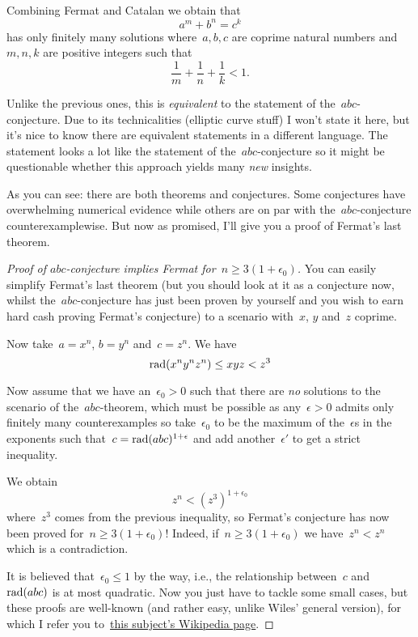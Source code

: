 \begin{description}
    Combining Fermat and Catalan we obtain that
    \begin{equation}
      a^m+b^n=c^k
    \end{equation}
    has only finitely many solutions where~$a,b,c$ are coprime natural numbers and~$m,n,k$ are positive integers such that
    \begin{equation}
      \frac{1}{m}+\frac{1}{n}+\frac{1}{k}<1.
    \end{equation}

  \item[\textbf{Szpiro's conjecture}] Unlike the previous ones, this is \emph{equivalent} to the statement of the~$abc$-conjecture. Due to its technicalities (elliptic curve stuff) I won't state it here, but it's nice to know there are equivalent statements in a different language. The statement looks a lot like the statement of the~$abc$\nobreakdash-conjecture so it might be questionable whether this approach yields many \emph{new} insights.
\end{description}

As you can see: there are both theorems and conjectures. Some conjectures have overwhelming numerical evidence while others are on par with the~$abc$-conjecture counterexamplewise. But now as promised, I'll give you a proof of Fermat's last theorem.


\begin{proof}[Proof of $abc$-conjecture implies Fermat for~$n\geq3(1+\epsilon_0)$]
  You can easily simplify Fermat's last theorem (but you should look at it as a conjecture now, whilst the~$abc$\nobreakdash-conjecture has just been proven by yourself and you wish to earn hard cash proving Fermat's conjecture) to a scenario with~$x$, $y$ and~$z$ coprime.
  
  Now take~$a=x^n$, $b=y^n$ and~$c=z^n$. We have
  \begin{equation}
    \operatorname{rad}(x^ny^nz^n)\leq xyz<z^3
  \end{equation}

  Now assume that we have an~$\epsilon_0>0$ such that there are \emph{no} solutions to the scenario of the~$abc$\nobreakdash-theorem, which must be possible as any~$\epsilon>0$ admits only finitely many counterexamples so take~$\epsilon_0$ to be the maximum of the~$\epsilon$s in the exponents such that~$c=\operatorname{rad}(abc)^{1+\epsilon}$ and add another~$\epsilon'$ to get a strict inequality.
  
  We obtain
  \begin{equation}
    z^n<(z^3)^{1+\epsilon_0}
  \end{equation}
  where~$z^3$ comes from the previous inequality, so Fermat's conjecture has now been proved for~$n\geq 3(1+\epsilon_0)$! Indeed, if~$n\geq 3(1+\epsilon_0)$ we have~$z^n<z^n$ which is a contradiction.

  It is believed that~$\epsilon_0\leq 1$ by the way, i.e., the relationship between~$c$ and~$\operatorname{rad}(abc)$ is at most quadratic. Now you just have to tackle some small cases, but these proofs are well-known (and rather easy, unlike Wiles' general version), for which I refer you to~\href{http://en.wikipedia.org/wiki/Fermat's_Last_Theorem#Proofs_for_specific_exponents}{this subject's Wikipedia page}.
\end{proof}
